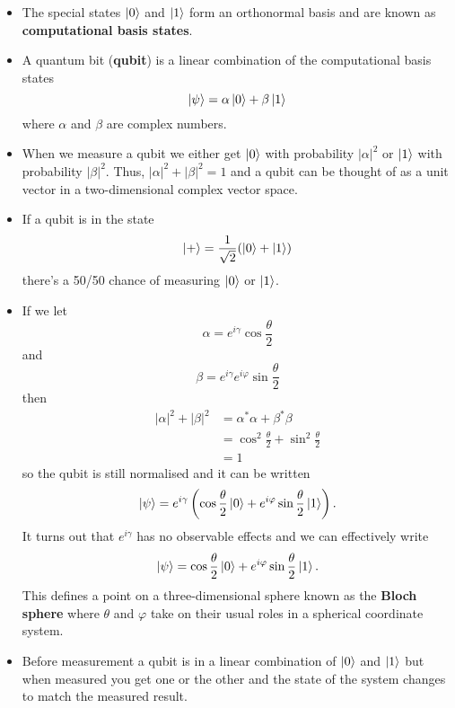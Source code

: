 \documentclass{article}
\begin{document}
\begin{itemize}
  \item The special states $\ket{0}$ and $\ket{1}$ form an orthonormal basis and are known as \textbf{computational basis states}.

  \item A quantum bit (\textbf{qubit}) is a linear combination of the computational basis states \[\ket{\psi} = \alpha \ket{0} + \beta \ket{1}\] where $\alpha$ and $\beta$ are complex numbers.

  \item When we measure a qubit we either get $\ket{0}$ with probability $|\alpha|^2$ or $\ket{1}$ with probability $|\beta|^2$. Thus, $|\alpha|^2 + |\beta|^2 = 1$ and a qubit can be thought of as a unit vector in a two-dimensional complex vector space.

  \item If a qubit is in the state \[\ket{+} = \frac{1}{\sqrt{2}} (\ket{0} + \ket{1})\] there's a 50/50 chance of measuring $\ket{0}$ or $\ket{1}$.

  \item If we let \[\alpha = e^{i \gamma} \cos \frac{\theta}{2}\] and \[\beta = e^{i \gamma} e^{i \varphi} \sin \frac{\theta}{2}\] then \begin{align*}
          |\alpha|^2 + |\beta|^2 & = \alpha^* \alpha + \beta^* \beta                   \\
                                 & = \cos^2 \frac{\theta}{2} + \sin^2 \frac{\theta}{2} \\
                                 & = 1
        \end{align*} so the qubit is still normalised and it can be written \[\ket{\psi} = e^{i \gamma} \left( \cos \frac{\theta}{2} \ket{0} + e^{i \varphi} \sin \frac{\theta}{2} \ket{1} \right).\] It turns out that $e^{i \gamma}$ has no observable effects and we can effectively write \[\ket{\psi} = \cos \frac{\theta}{2} \ket{0} + e^{i \varphi} \sin \frac{\theta}{2} \ket{1}.\] This defines a point on a three-dimensional sphere known as the \textbf{Bloch sphere} where $\theta$ and $\varphi$ take on their usual roles in a spherical coordinate system.

  \item Before measurement a qubit is in a linear combination of $\ket{0}$ and $\ket{1}$ but when measured you get one or the other and the state of the system changes to match the measured result.
\end{itemize}
\end{document}
